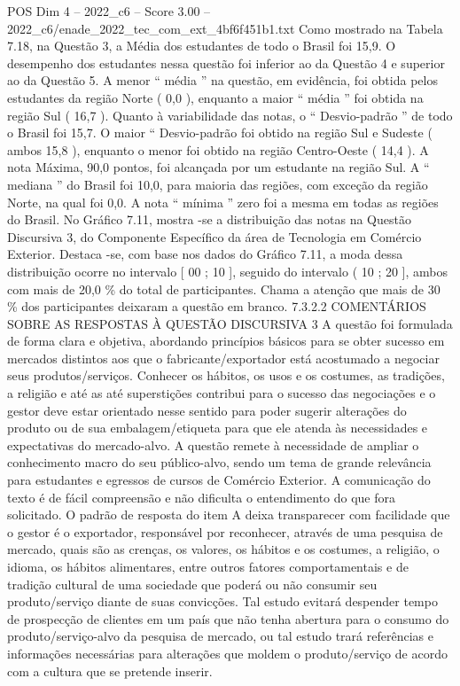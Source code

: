 \begin{textsample}{POS Dim 4 – 2022\_c6 – Score 3.00 – 2022\_c6/enade\_2022\_tec\_com\_ext\_4bf6f451b1.txt}
Como mostrado na Tabela 7.18, na Questão 3, a Média dos estudantes de todo o Brasil foi 15,9.
O desempenho dos estudantes nessa questão foi inferior ao da Questão 4 e superior ao da Questão 5.
A menor “ média ” na questão, em evidência, foi obtida pelos estudantes da região Norte ( 0,0 ), enquanto a maior “ média ” foi obtida na região Sul ( 16,7 ).
Quanto à variabilidade das notas, o “ Desvio-padrão ” de todo o Brasil foi 15,7.
O maior “ Desvio-padrão foi obtido na região Sul e Sudeste ( ambos 15,8 ), enquanto o menor foi obtido na região Centro-Oeste ( 14,4 ).
A nota Máxima, 90,0 pontos, foi alcançada por um estudante na região Sul.
A “ mediana ” do Brasil foi 10,0, para maioria das regiões, com exceção da região Norte, na qual foi 0,0.
A nota “ mínima ” zero foi a mesma em todas as regiões do Brasil.
No Gráfico 7.11, mostra -se a distribuição das notas na Questão Discursiva 3, do Componente Específico da área de Tecnologia em Comércio Exterior.
Destaca -se, com base nos dados do Gráfico 7.11, a moda dessa distribuição ocorre no intervalo [ 00 ; 10 ], seguido do intervalo ( 10 ; 20 ], ambos com mais de 20,0 \% do total de participantes.
Chama a atenção que mais de 30 \% dos participantes deixaram a questão em branco. 7.3.2.2 COMENTÁRIOS SOBRE AS RESPOSTAS À QUESTÃO DISCURSIVA 3 A questão foi formulada de forma clara e objetiva, abordando princípios básicos para se obter sucesso em mercados distintos aos que o fabricante/exportador está acostumado a negociar seus produtos/serviços.
Conhecer os hábitos, os usos e os costumes, as tradições, a religião e até as até superstições contribui para o sucesso das negociações e o gestor deve estar orientado nesse sentido para poder sugerir alterações do produto ou de sua embalagem/etiqueta para que ele atenda às necessidades e expectativas do mercado-alvo.
A questão remete à necessidade de ampliar o conhecimento macro do seu público-alvo, sendo um tema de grande relevância para estudantes e egressos de cursos de Comércio Exterior.
A comunicação do texto é de fácil compreensão e não dificulta o entendimento do que fora solicitado.
O padrão de resposta do item A deixa transparecer com facilidade que o gestor é o exportador, responsável por reconhecer, através de uma pesquisa de mercado, quais são as crenças, os valores, os hábitos e os costumes, a religião, o idioma, os hábitos alimentares, entre outros fatores comportamentais e de tradição cultural de uma sociedade que poderá ou não consumir seu produto/serviço diante de suas convicções.
Tal estudo evitará despender tempo de prospecção de clientes em um país que não tenha abertura para o consumo do produto/serviço-alvo da pesquisa de mercado, ou tal estudo trará referências e informações necessárias para alterações que moldem o produto/serviço de acordo com a cultura que se pretende inserir.

\end{textsample}
